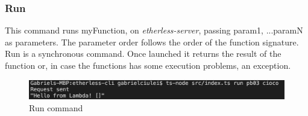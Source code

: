 


\subsubsection{Run}
This command runs myFunction, on \textit{etherless-server}, passing param1, ...paramN as parameters. The parameter order follows the order of the function signature. Run is a synchronous command. Once launched it returns the result of the function or, in case the functions has some execution problems, an exception.\\
\centerline{}
\begin{figure}
	\centering
	\includegraphics[width=\textwidth]{res/img/Screenshot_run.png}
	\caption{Run command}
\end{figure}

